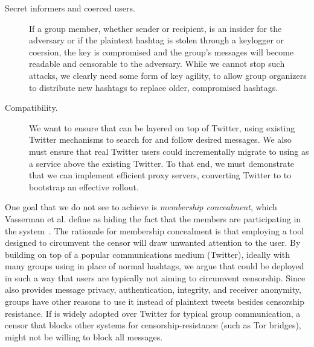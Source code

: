 \begin{description}
\item[Secret informers and coerced users.] If a group member, whether
  sender or recipient, is an insider for the adversary or if the
  plaintext hashtag is stolen through a keylogger or coersion, the key
  is compromised and the group's messages will become readable and
  censorable to the adversary. While we cannot stop such attacks, we
  clearly need some form of key agility, to allow group organizers to
  distribute new hashtags to replace older, compromised hashtags.

\item[Compatibility.] We want to ensure that \hoot can be layered on top
  of Twitter, using existing Twitter mechanisms to search for and follow
  desired messages. We also must ensure that real Twitter users could
  incrementally migrate to using \hoot  as a service above the existing
  Twitter. To that end, we must demonstrate that we can implement
  efficient proxy servers, converting Twitter to \hoot to bootstrap an
  effective \hoot rollout.

\end{description}

One goal that we do not see to achieve is {\em membership concealment},
which Vasserman et al. define as hiding the fact that the members are
participating in the system~\cite{vasserman09mcon}. The rationale for
membership concealment is that employing a tool designed to circumvent
the censor will draw unwanted attention to the user. By building \hoot
on top of a popular communications medium (Twitter), ideally with many
groups using \hoot in place of normal hashtags, we argue that \hoot
could be deployed in such a way that users are typically not aiming to
circumvent censorship. Since \hoot also provides message privacy,
authentication, integrity, and receiver anonymity, groups have other
reasons to use it instead of plaintext tweets besides censorship
resistance. If \hoot is widely adopted over Twitter for typical group
communication, a censor that blocks other systems for
censorship-resistance (such as Tor bridges), might not be willing to
block all \hoot messages. 

